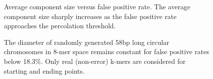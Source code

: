 \documentclass{pnastwo}
\begin{document}
\begin{figure}
\caption{Average component size versus false positive rate. The average 
component size sharply increases as the false positive 
rate approaches the percolation threshold.
}
\label{fig:clustersize}
\end{figure}

\begin{figure}

\caption{The diameter of randomly generated 58bp long circular
  chromosomes in 8-mer space remains constant for false
  positive rates below 18.3\%. Only real (non-error) k-mers are considered for
  starting and ending points.}
\label{fig:diam}
\end{figure}
\end{document}
